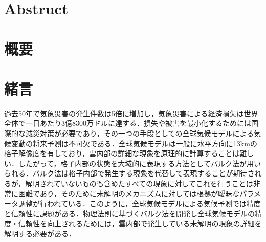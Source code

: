 \section*{Abstruct}
\newpage
\section*{概要}

\newpage
\tableofcontents
\newpage
\section{緒言}
過去50年で気象災害の発生件数は5倍に増加し，気象災害による経済損失は世界全体で一日あたり3億8300万ドルに達する\cite{wmo2021}．損失や被害を最小化するためには国際的な減災対策が必要であり，その一つの手段としての全球気候モデルによる気候変動の将来予測は不可欠である．全球気候モデルは一般に水平方向に13kmの格子解像度を有しており\cite{}，雲内部の詳細な現象を原理的に計算することは難しい\cite{gsm}．したがって，格子内部の状態を大域的に表現する方法としてバルク法が用いられる\cite{bulk}．バルク法は格子内部で発生する現象を代替して表現することが期待されるが，解明されていないものも含めたすべての現象に対してこれを行うことは非常に困難であり，そのために未解明のメカニズムに対しては根拠が曖昧なパラメータ調整が行われている\cite{hourdin}．このように，全球気候モデルによる気候予測では精度と信頼性に課題がある．物理法則に基づくバルク法を開発し全球気候モデルの精度・信頼性を向上されるためには，雲内部で発生している未解明の現象の詳細を解明する必要がある．


